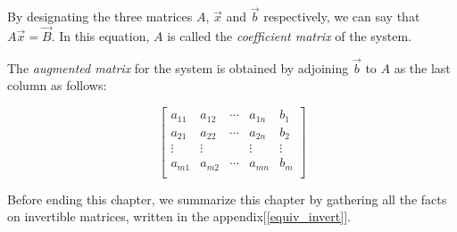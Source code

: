 \documentclass{report}
\begin{document}
		By designating the three matrices $A$, $\vec{x}$ and $\vec{b}$ respectively, we can say that $A\vec{x}=\vec{B}$. In this equation, $A$ is called the \emph{coefficient matrix} of the system.
		
		The \emph{augmented matrix} for the system is obtained by adjoining $\vec{b}$ to $A$ as the last column as follows:
		
		\begin{displaymath}
			\left[\begin{array}{cccc|c}
				a_{11} & a_{12} & \cdots & a_{1n} & b_1\\
				a_{21} & a_{22} & \cdots & a_{2n} & b_2\\
				\vdots & \vdots &        & \vdots & \vdots\\
				a_{m1} & a_{m2} & \cdots & a_{mn} & b_m\\
			\end{array}\right]
		\end{displaymath}
	
		Before ending this chapter, we summarize this chapter by gathering all the facts on invertible matrices, written in the appendix[\ref{equiv_invert}].
\end{document}
